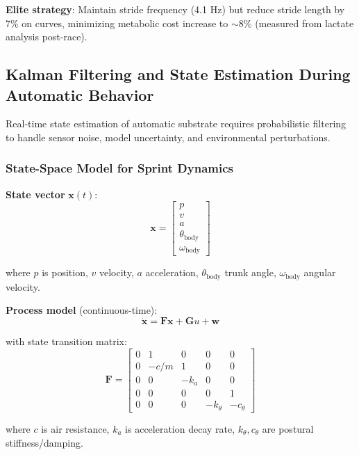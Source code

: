 \documentclass[11pt,onecolumn]{article}
\begin{document}
\textbf{Elite strategy}: Maintain stride frequency (4.1 Hz) but reduce stride length by 7\% on curves, minimizing metabolic cost increase to $\sim$8\% (measured from lactate analysis post-race).

\subsection{Kalman Filtering and State Estimation During Automatic Behavior}

Real-time state estimation of automatic substrate requires probabilistic filtering to handle sensor noise, model uncertainty, and environmental perturbations.

\subsubsection{State-Space Model for Sprint Dynamics}

\textbf{State vector} $\mathbf{x}(t)$:
\begin{equation}
\mathbf{x} = \begin{bmatrix} p \\ v \\ a \\ \theta_{\text{body}} \\ \omega_{\text{body}} \end{bmatrix}
\end{equation}

where $p$ is position, $v$ velocity, $a$ acceleration, $\theta_{\text{body}}$ trunk angle, $\omega_{\text{body}}$ angular velocity.

\textbf{Process model} (continuous-time):
\begin{equation}
\dot{\mathbf{x}} = \mathbf{F}\mathbf{x} + \mathbf{G}u + \mathbf{w}
\end{equation}

with state transition matrix:
\begin{equation}
\mathbf{F} = \begin{bmatrix}
0 & 1 & 0 & 0 & 0 \\
0 & -c/m & 1 & 0 & 0 \\
0 & 0 & -k_a & 0 & 0 \\
0 & 0 & 0 & 0 & 1 \\
0 & 0 & 0 & -k_\theta & -c_\theta
\end{bmatrix}
\end{equation}

where $c$ is air resistance, $k_a$ is acceleration decay rate, $k_\theta, c_\theta$ are postural stiffness/damping.
\end{document}
